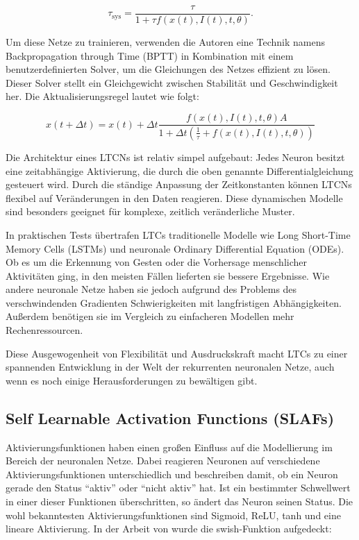 \documentclass[11pt,ngerman,a4paper,]{article}
\begin{document}
\[
\tau_{\text{sys}} = \frac{\tau}{1 + \tau f(x(t), I(t), t, \theta)}.
\]

Um diese Netze zu trainieren, verwenden die Autoren eine Technik namens Backpropagation through Time (BPTT) in Kombination mit einem benutzerdefinierten Solver, um die Gleichungen des Netzes effizient zu lösen. Dieser Solver stellt ein Gleichgewicht zwischen Stabilität und Geschwindigkeit her. Die Aktualisierungsregel lautet wie folgt:

\[
x(t + \Delta t) = x(t) + \Delta t \frac{f(x(t), I(t), t, \theta)A}{1 + \Delta t \left(\frac{1}{\tau} + f(x(t), I(t), t, \theta)\right)}
\]

Die Architektur eines LTCNs ist relativ simpel aufgebaut: Jedes Neuron besitzt eine zeitabhängige Aktivierung, die durch die oben genannte Differentialgleichung gesteuert wird. Durch die ständige Anpassung der Zeitkonstanten können LTCNs flexibel auf Veränderungen in den Daten reagieren. Diese dynamischen Modelle sind besonders geeignet für komplexe, zeitlich veränderliche Muster.

In praktischen Tests übertrafen LTCs traditionelle Modelle wie Long Short-Time Memory Cells (LSTMs) und neuronale Ordinary Differential Equation (ODEs). Ob es um die Erkennung von Gesten oder die Vorhersage menschlicher Aktivitäten ging, in den meisten Fällen lieferten sie bessere Ergebnisse. Wie andere neuronale Netze haben sie jedoch aufgrund des Problems des verschwindenden Gradienten Schwierigkeiten mit langfristigen Abhängigkeiten. Außerdem benötigen sie im Vergleich zu einfacheren Modellen mehr Rechenressourcen.

Diese Ausgewogenheit von Flexibilität und Ausdruckskraft macht LTCs zu einer spannenden Entwicklung in der Welt der rekurrenten neuronalen Netze, auch wenn es noch einige Herausforderungen zu bewältigen gibt.

\subsection{Self Learnable Activation Functions (SLAFs)}\label{self-learnable-activation-functions-slafs}

Aktivierungsfunktionen haben einen großen Einfluss auf die Modellierung im Bereich der neuronalen Netze. Dabei reagieren Neuronen auf verschiedene Aktivierungsfunktionen unterschiedlich und beschreiben damit, ob ein Neuron gerade den Status ``aktiv'' oder ``nicht aktiv'' hat. Ist ein bestimmter Schwellwert in einer dieser Funktionen überschritten, so ändert das Neuron seinen Status. Die wohl bekanntesten Aktivierungsfunktionen sind Sigmoid, ReLU, tanh und eine lineare Aktivierung. In der Arbeit von \cite{Ramachandran2017} wurde die swish-Funktion aufgedeckt:
\end{document}
